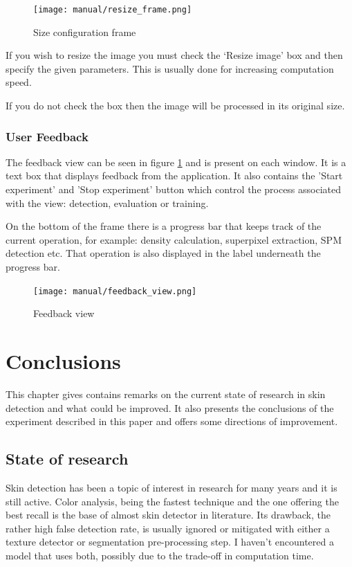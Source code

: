 \documentclass[12pt]{report}
\begin{document}
	\begin{figure}
		\begin{center}
			\texttt{[image: manual/resize\_frame.png]}
		\end{center}
		\caption{Size configuration frame}
	\end{figure}
	
	If you wish to resize the image you must check the ‘Resize image’ box and then specify the given parameters. This is usually done for increasing computation speed.
	
	If you do not check the box then the image will be processed in its original size.
	
	\subsection{User Feedback}
	
	The feedback view can be seen in figure \ref{feedback_view} and is present on each window. It is a text box that displays feedback from the application. It also contains the 'Start experiment' and 'Stop experiment' button which control the process associated with the view: detection, evaluation or training.
	
	On the bottom of the frame there is a progress bar that keeps track of the current operation, for example: density calculation, superpixel extraction, SPM detection etc. That operation is also displayed in the label underneath the progress bar.
	
	
	\begin{figure}[h!]
		\centering
		\texttt{[image: manual/feedback\_view.png]}
		\caption{Feedback view}
		\label{feedback_view}
	\end{figure}

	\chapter{Conclusions}
	This chapter gives contains remarks on the current state of research in skin detection and what could be improved. It also presents the conclusions of the experiment described in this paper and offers some directions of improvement.
	
	\section{State of research}
	Skin detection has been a topic of interest in research for many years and it is still active. Color analysis, being the fastest technique and the one offering the best recall is the base of almost skin detector in literature. Its drawback, the rather high false detection rate, is usually ignored or mitigated with either a texture detector or segmentation pre-processing step. I haven't encountered a model that uses both, possibly due to the trade-off in computation time.
	
\end{document}
